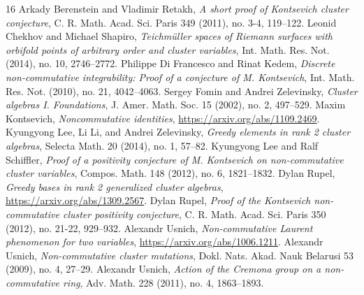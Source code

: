\begin{thebibliography}{16}
 Arkady Berenstein and Vladimir Retakh, \emph{A short proof of Kontsevich cluster conjecture}, C. R. Math. Acad. Sci. Paris 349 (2011), no. 3-4, 119--122.
 Leonid Chekhov and Michael Shapiro, \emph{Teichm\"uller spaces of Riemann surfaces with orbifold points of arbitrary order and cluster variables}, Int. Math. Res. Not. (2014), no. 10, 2746--2772.
 Philippe Di Francesco and Rinat Kedem, \emph{Discrete non-commutative integrability: Proof of a conjecture of M. Kontsevich}, Int. Math. Res. Not. (2010), no. 21, 4042--4063.
 Sergey Fomin and Andrei Zelevinsky, \emph{Cluster algebras I. Foundations}, J. Amer. Math. Soc. 15 (2002), no. 2, 497--529.
 Maxim Kontsevich, \emph{Noncommutative identities}, \url{https://arxiv.org/abs/1109.2469}.
 Kyungyong Lee, Li Li, and Andrei Zelevinsky, \emph{Greedy elements in rank 2 cluster algebras}, Selecta Math. 20 (2014), no. 1, 57--82.
 Kyungyong Lee and Ralf Schiffler, \emph{Proof of a positivity conjecture of M. Kontsevich on non-commutative cluster variables}, Compos. Math. 148 (2012), no. 6, 1821--1832.
 Dylan Rupel, \emph{Greedy bases in rank 2 generalized cluster algebras}, \url{https://arxiv.org/abs/1309.2567}.
 Dylan Rupel, \emph{Proof of the Kontsevich non-commutative cluster positivity conjecture}, C. R. Math. Acad. Sci. Paris 350 (2012), no. 21-22, 929--932.
 Alexandr Usnich, \emph{Non-commutative Laurent phenomenon for two variables}, \url{https://arxiv.org/abs/1006.1211}.
 Alexandr Usnich, \emph{Non-commutative cluster mutations}, Dokl. Nats. Akad. Nauk Belarusi 53 (2009), no. 4, 27--29.
 Alexandr Usnich, \emph{Action of the Cremona group on a non-commutative ring}, Adv. Math. 228 (2011), no. 4, 1863--1893.
\end{thebibliography}
